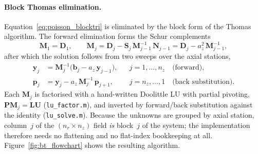 \documentclass[12pt,a4paper]{article}
\begin{document}
\paragraph{Block Thomas elimination.}
Equation~\eqref{eq:poisson_blocktri} is eliminated by the block form of the Thomas algorithm.
The forward elimination forms the Schur complements
\begin{equation}
    \mathbf{M}_1 = \mathbf{D}_1,
    \qquad
    \mathbf{M}_j = \mathbf{D}_j - \mathbf{S}_j\,\mathbf{M}_{j-1}^{-1}\,\mathbf{N}_{j-1}
                 = \mathbf{D}_j - a_z^2\,\mathbf{M}_{j-1}^{-1} ,
    \label{eq:schur}
\end{equation}
after which the solution follows from two sweeps over the axial stations,
\begin{align}
    \mathbf{y}_j &= \mathbf{M}_j^{-1}\big(\mathbf{b}_j - a_z\,\mathbf{y}_{j-1}\big),
        && j = 1,\dots,n_z \quad \text{(forward)}, \\
    \mathbf{p}_j &= \mathbf{y}_j - a_z\,\mathbf{M}_j^{-1}\,\mathbf{p}_{j+1},
        && j = n_z,\dots,1 \quad \text{(back substitution)} .
\end{align}
Each $\mathbf{M}_j$ is factorised with a hand-written Doolittle LU with partial pivoting, $\mathbf{P}\mathbf{M}_j = \mathbf{L}\mathbf{U}$ (\texttt{lu\_factor.m}), and inverted by forward/back substitution against the identity (\texttt{lu\_solve.m}).
Because the unknowns are grouped by axial station, column~$j$ of the $(n_r \times n_z)$ field \emph{is} block~$j$ of the system; the implementation therefore needs no flattening and no flat-index bookkeeping at all.
Figure~\ref{fig:bt_flowchart} shows the resulting algorithm.
\end{document}

